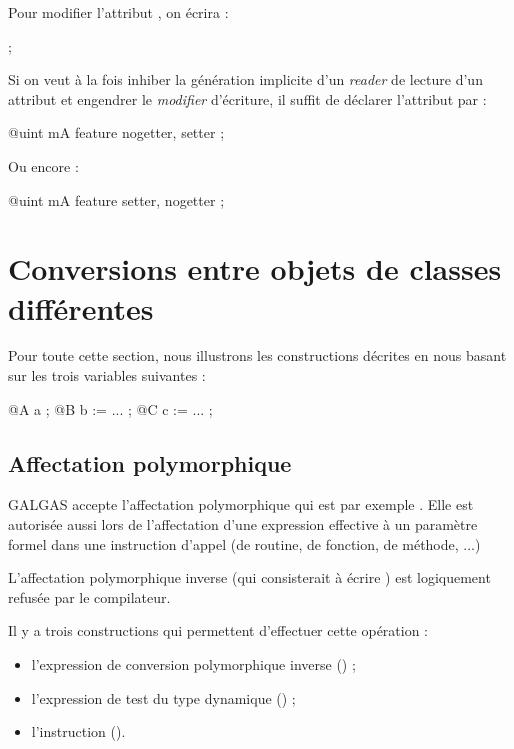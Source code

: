 Pour modifier l'attribut , on écrira :

\begin{galgascode}
[!?b setMA !12] ;
\end{galgascode}

Si on veut à la fois inhiber la génération implicite d'un \emph{reader} de lecture d'un attribut et engendrer le \emph{modifier} d'écriture, il suffit de déclarer l'attribut par :

\begin{galgascode}
  @uint mA feature nogetter, setter ;
\end{galgascode}

Ou encore :

\begin{galgascode}
  @uint mA feature setter, nogetter ;
\end{galgascode}












\section{Conversions entre objets de classes différentes}

Pour toute cette section, nous illustrons les constructions décrites en nous basant sur les trois variables suivantes :

\begin{galgascode}
@A a ;
@B b := ... ;
@C c := ... ;
\end{galgascode}

\subsection{Affectation polymorphique}

GALGAS accepte l'affectation polymorphique qui est par exemple . Elle est autorisée aussi lors de l'affectation d'une expression effective à un paramètre formel dans une instruction d'appel (de routine, de fonction, de méthode, ...)

L'affectation polymorphique inverse (qui consisterait à écrire ) est logiquement refusée par le compilateur.

Il y a trois constructions qui permettent d'effectuer cette opération :
\begin{itemize}
  \item l'expression de conversion polymorphique inverse () ;
  \item l'expression de test du type dynamique () ;
  \item l'instruction  ().
\end{itemize}

